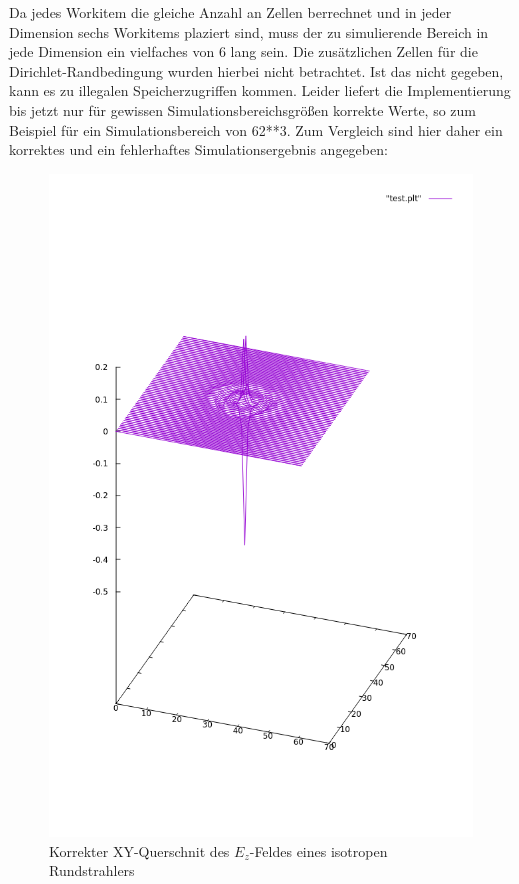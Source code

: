 \documentclass[11pt, ngerman]{article}
\begin{document}

Da jedes Workitem die gleiche Anzahl an Zellen berrechnet und in jeder Dimension
sechs Workitems plaziert sind, muss der zu simulierende Bereich in jede Dimension
ein vielfaches von 6 lang sein. Die zus\"atzlichen Zellen f\"ur die Dirichlet-Randbedingung
wurden hierbei nicht betrachtet. Ist das nicht gegeben, kann es zu illegalen
Speicherzugriffen kommen. Leider liefert die Implementierung bis jetzt nur f\"ur
gewissen Simulationsbereichsgr\"o{\ss}en korrekte Werte, so zum Beispiel f\"ur ein
Simulationsbereich von 62**3. Zum Vergleich sind hier daher ein korrektes und
ein fehlerhaftes Simulationsergebnis  angegeben:

\begin{figure}[H]
\includegraphics[width=\textwidth]{./fdtd_3d_iter_korrekt}
	\caption{Korrekter XY-Querschnit des \(E_z\)-Feldes eines isotropen Rundstrahlers}
\end{figure}
\end{document}
